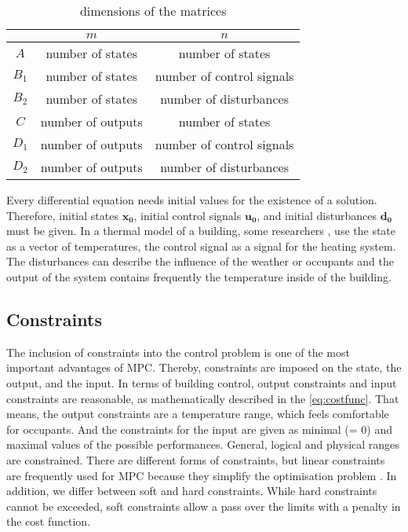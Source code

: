     \begin{table}[]
        \centering
        \begin{tabular}{c|c|c}
            & $m$ & $n$  \\
            \hline
            $A$ & number of states & number of states\\
            $B_\text{1}$ & number of states & number of control signals\\
            $B_\text{2}$ & number of states & number of disturbances\\
            $C$ & number of outputs & number of states\\
            $D_\text{1}$ & number of outputs & number of control signals\\
            $D_\text{2}$ & number of outputs & number of disturbances\\
        \end{tabular}
        \caption{dimensions of the matrices}
        \label{tab:matrixDim}
    \end{table}
    Every differential equation needs initial values for the existence of a solution. Therefore, initial states $\mathbf{x_0}$, initial control signals $\mathbf{u_0}$, and initial disturbances $\mathbf{d_0}$ must be given.
    In a thermal model of a building, some researchers \cite{Hazyuk.2012}, \cite{Siroky.2011} use the state as a vector of temperatures, the control signal as a signal for the heating system. The disturbances can describe the influence of the weather or occupants and the output of the system contains frequently the temperature inside of the building.
    


\subsection{Constraints}
\label{subsection:constraints}

The inclusion of constraints into the control problem is one of the most important advantages of MPC. Thereby, constraints are imposed on the state, the output, and the input. In terms of building control, output constraints and input constraints are reasonable, as mathematically described in the \autoref{eq:costfunc}. That means, the output constraints are a temperature range, which feels comfortable for occupants. And the constraints for the input are given as minimal (= 0) and maximal values of the possible performances. General, logical and physical ranges are constrained. There are different forms of constraints, but linear constraints are frequently used for MPC because they simplify the optimisation problem \cite{Siroky.2011}. In addition, we differ between soft and hard constraints. While hard constraints cannot be exceeded, soft constraints allow a pass over the limits with a penalty in the cost function.

